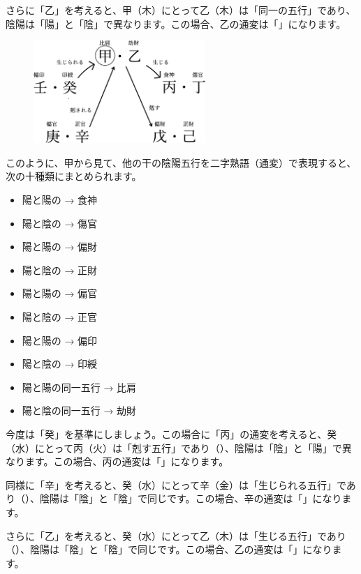\documentclass[a5paper,11pt,dvipdfmx]{tarticle}
\begin{document}
さらに「乙」を考えると、甲（木）にとって乙（木）は「同一の五行」であり、陰陽は「陽」と「陰」で異なります。この場合、乙の通変は「」になります。

\begin{figure}
  \includegraphics[width=65mm,angle=90]{figs/figure5-4.eps}
\end{figure}

このように、甲から見て、他の干の陰陽五行を二字熟語（通変）で表現すると、次の十種類にまとめられます。

\begin{itemize}
  \item 陽と陽の → 食神
  \item 陽と陰の → 傷官
  \item 陽と陽の → 偏財
  \item 陽と陰の → 正財
  \item 陽と陽の → 偏官
  \item 陽と陰の → 正官
  \item 陽と陽の → 偏印
  \item 陽と陰の → 印綬
  \item 陽と陽の同一五行 → 比肩
  \item 陽と陰の同一五行 → 劫財
\end{itemize}

今度は「癸」を基準にしましょう。この場合に「丙」の通変を考えると、癸（水）にとって丙（火）は「剋す五行」であり（）、陰陽は「陰」と「陽」で異なります。この場合、丙の通変は「」になります。

同様に「辛」を考えると、癸（水）にとって辛（金）は「生じられる五行」であり（）、陰陽は「陰」と「陰」で同じです。この場合、辛の通変は「」になります。

さらに「乙」を考えると、癸（水）にとって乙（木）は「生じる五行」であり（）、陰陽は「陰」と「陰」で同じです。この場合、乙の通変は「」になります。
\end{document}
